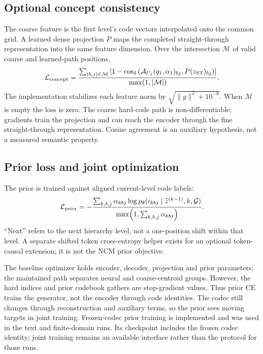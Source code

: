 \documentclass[11pt,a4paper]{article}
\begin{document}
\subsection{Optional concept consistency}
The coarse feature is the first level's code vectors interpolated onto the
common grid. A learned dense projection \(P\) maps the completed
straight-through representation into the same feature dimension. Over the
intersection \(\mathcal{M}\) of valid coarse and learned-path positions,
\begin{equation}
 \mathcal{L}_{\mathrm{concept}}=
 \frac{\sum_{(b,j)\in\mathcal M}
  \left[1-\operatorname{cos}_{\delta}
   \left(\mathcal{A}_{U_1}(q_1,\alpha_1)_{bj},P(z_{\mathrm{ST}})_{bj}\right)\right]}
 {\max\!\left(1,|\mathcal M|\right)}.
\end{equation}
The implementation stabilizes each feature norm by
\(\sqrt{\|g\|^2+10^{-8}}\). When \(\mathcal M\) is empty the loss is zero.
The coarse hard-code path is non-differentiable; gradients train the projection
and can reach the encoder through the fine straight-through representation.
Cosine agreement is an auxiliary hypothesis, not a measured semantic property.

\subsection{Prior loss and joint optimization}
The prior is trained against aligned current-level code labels:
\begin{equation}
 \mathcal{L}_{\mathrm{prior}}=
 -\frac{\sum_{k,b,j}\alpha_{kbj}
    \log p_\theta(i_{kbj}\mid\widehat z^{(k-1)},k,\mathcal G)}
 {\max\!\left(1,\sum_{k,b,j}\alpha_{kbj}\right)}.
\end{equation}
``Next'' refers to the next hierarchy level, not a one-position shift within
that level. A separate shifted token cross-entropy helper exists for an
optional token-causal extension; it is not the NCM prior objective.

The baseline optimizer holds encoder, decoder, projection and prior parameters;
the maintained path separates neural and coarse-centroid groups.
However, the hard indices and prior codebook gathers are stop-gradient values.
Thus prior CE trains the generator, not the encoder through code identities.
The codec still changes through reconstruction and auxiliary terms, so the
prior sees moving targets in joint training. Frozen-codec prior training is implemented and was used in the text and
finite-domain runs. Its checkpoint includes the frozen codec identity; joint
training remains an available interface rather than the protocol for those runs.
\end{document}
